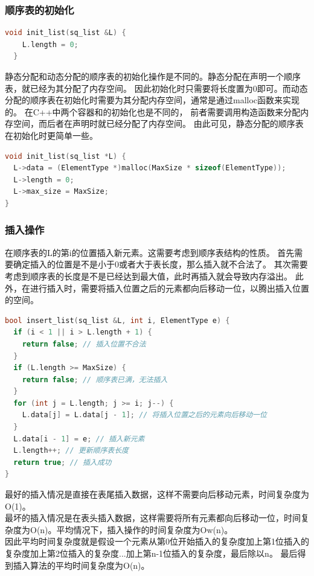 \documentclass[b5paper,11pt]{article}
\begin{document}
\subsubsection{顺序表的初始化}

\begin{lstlisting}[language=C++]
  void init_list(sq_list &L) {
    L.length = 0;
  }
\end{lstlisting}

静态分配和动态分配的顺序表的初始化操作是不同的。静态分配在声明一个顺序表，就已经为其分配了内存空间。
因此初始化时只需要将长度置为0即可。而动态分配的顺序表在初始化时需要为其分配内存空间，通常是通过malloc函数来实现的。
在C++中两个容器和的初始化也是不同的，
前者需要调用构造函数来分配内存空间，而后者在声明时就已经分配了内存空间。
由此可见，静态分配的顺序表在初始化时更简单一些。
\begin {lstlisting}[language=C++]
void init_list(sq_list *L) {
  L->data = (ElementType *)malloc(MaxSize * sizeof(ElementType));
  L->length = 0;
  L->max_size = MaxSize;
}
\end{lstlisting}

\subsubsection{插入操作}
在顺序表的L的第i的位置插入新元素。这需要考虑到顺序表结构的性质。
首先需要确定插入的位置是不是小于0或者大于表长度，那么插入就不合法了。
其次需要考虑到顺序表的长度是不是已经达到最大值，此时再插入就会导致内存溢出。
此外，在进行插入时，需要将插入位置之后的元素都向后移动一位，以腾出插入位置的空间。
\begin{lstlisting}[language=C++]
bool insert_list(sq_list &L, int i, ElementType e) {
  if (i < 1 || i > L.length + 1) {
    return false; // 插入位置不合法
  }
  if (L.length >= MaxSize) {
    return false; // 顺序表已满，无法插入
  }
  for (int j = L.length; j >= i; j--) {
    L.data[j] = L.data[j - 1]; // 将插入位置之后的元素向后移动一位
  }
  L.data[i - 1] = e; // 插入新元素
  L.length++; // 更新顺序表长度
  return true; // 插入成功
}
\end{lstlisting}
最好的插入情况是直接在表尾插入数据，这样不需要向后移动元素，时间复杂度为O(1)。 \\
最坏的插入情况是在表头插入数据，这样需要将所有元素都向后移动一位，时间复杂度为O(n)。平均情况下，插入操作的时间复杂度为Ow(n)。 \\
因此平均时间复杂度就是假设一个元素从第0位开始插入的复杂度加上第1位插入的复杂度加上第2位插入的复杂度...加上第n-1位插入的复杂度，最后除以n。
最后得到插入算法的平均时间复杂度为O(n)。
\end{document}
